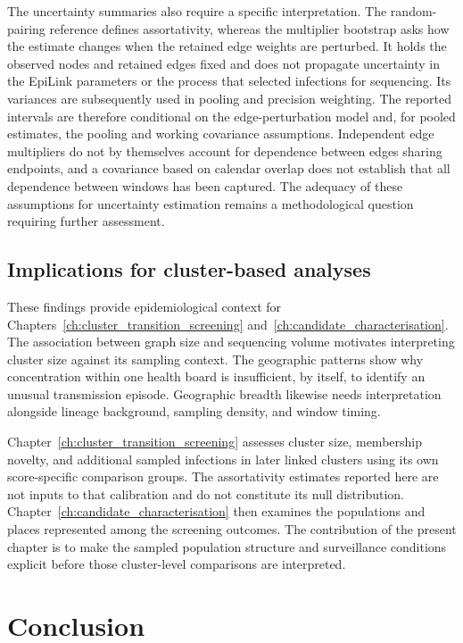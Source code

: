 The uncertainty summaries also require a specific interpretation. The random-pairing reference defines assortativity, whereas the multiplier bootstrap asks how the estimate changes when the retained edge weights are perturbed. It holds the observed nodes and retained edges fixed and does not propagate uncertainty in the EpiLink parameters or the process that selected infections for sequencing. Its variances are subsequently used in pooling and precision weighting. The reported intervals are therefore conditional on the edge-perturbation model and, for pooled estimates, the pooling and working covariance assumptions. Independent edge multipliers do not by themselves account for dependence between edges sharing endpoints, and a covariance based on calendar overlap does not establish that all dependence between windows has been captured. The adequacy of these assumptions for uncertainty estimation remains a methodological question requiring further assessment.

\subsection{Implications for cluster-based analyses}\label{sec:ch4_discussion_implications}

These findings provide epidemiological context for Chapters~\ref{ch:cluster_transition_screening} and~\ref{ch:candidate_characterisation}. The association between graph size and sequencing volume motivates interpreting cluster size against its sampling context. The geographic patterns show why concentration within one health board is insufficient, by itself, to identify an unusual transmission episode. Geographic breadth likewise needs interpretation alongside lineage background, sampling density, and window timing.

Chapter~\ref{ch:cluster_transition_screening} assesses cluster size, membership novelty, and additional sampled infections in later linked clusters using its own score-specific comparison groups. The assortativity estimates reported here are not inputs to that calibration and do not constitute its null distribution. Chapter~\ref{ch:candidate_characterisation} then examines the populations and places represented among the screening outcomes. The contribution of the present chapter is to make the sampled population structure and surveillance conditions explicit before those cluster-level comparisons are interpreted.

\section{Conclusion}\label{sec:ch4_discussion_conclusions}

